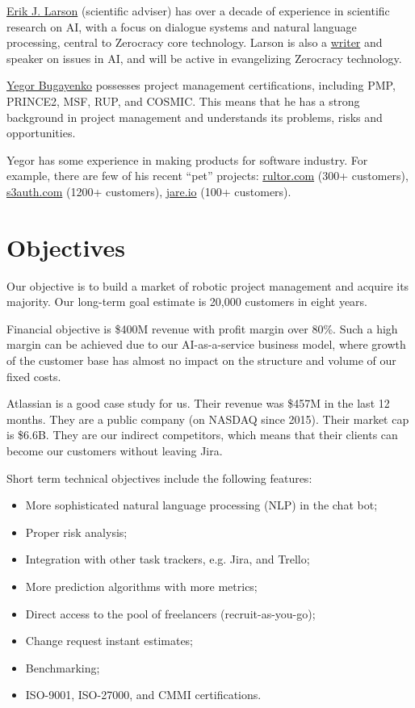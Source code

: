 \documentclass{main}
\begin{document}
\href{https://www.linkedin.com/in/erik-larson-b287ba9}{Erik J. Larson} (scientific adviser) has over a decade of experience in
scientific research on AI, with a focus on dialogue systems and natural language
processing, central to Zerocracy core technology. Larson is also a
\href{https://www.theatlantic.com/technology/archive/2015/05/the-humanists-paradox/391622/}{writer} and
speaker on issues in AI, and will be active in evangelizing Zerocracy
technology.

\href{http://www.yegor256.com/about-me.html}{Yegor Bugayenko} possesses project management certifications, including PMP,
PRINCE2, MSF, RUP, and COSMIC. This means that he has a strong background in
project management and understands its problems, risks and opportunities.

Yegor has some experience in making products for software industry. For example,
there are few of his recent ``pet'' projects:
\href{http://www.rultor.com}{rultor.com} (300+ customers),
\href{http://www.s3auth.com}{s3auth.com} (1200+ customers),
\href{http://www.jare.io}{jare.io} (100+ customers).


\section{Objectives}

Our objective is to build a market of robotic project management and acquire its
majority. Our long-term goal estimate is 20,000 customers in eight years.

Financial objective is \$400M revenue with profit margin over 80\%. Such a high
margin can be achieved due to our AI-as-a-service business model, where growth
of the customer base has almost no impact on the structure and volume of our
fixed costs.

Atlassian is a good case study for us. Their revenue was \$457M in the last 12
months. They are a public company (on NASDAQ since 2015). Their market cap is
\$6.6B. They are our indirect competitors, which means that their clients can
become our customers without leaving Jira.

Short term technical objectives include the following features:

\begin{itemize}\itemsep0em
  \item More sophisticated natural language processing (NLP) in the chat bot;
  \item Proper risk analysis;
  \item Integration with other task trackers, e.g. Jira, and Trello;
  \item More prediction algorithms with more metrics;
  \item Direct access to the pool of freelancers (recruit-as-you-go);
  \item Change request instant estimates;
  \item Benchmarking;
  \item ISO-9001, ISO-27000, and CMMI certifications.
\end{itemize}
\end{document}
